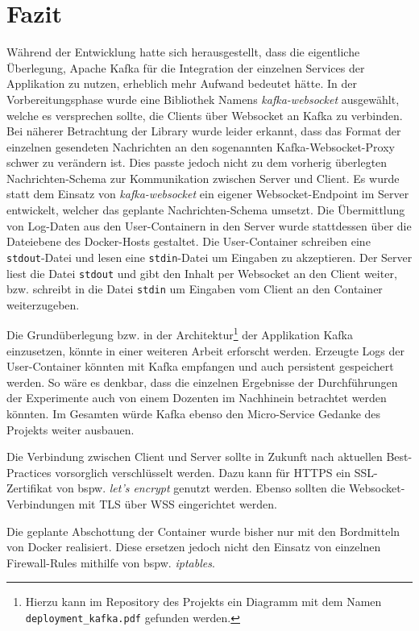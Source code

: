 \chapter{Fazit}
Während der Entwicklung hatte sich herausgestellt, dass die eigentliche Überlegung, Apache Kafka für die Integration der einzelnen Services der Applikation zu nutzen, erheblich mehr Aufwand bedeutet hätte.
In der Vorbereitungsphase wurde eine Bibliothek Namens \textit{kafka-websocket} ausgewählt, welche es versprechen sollte, die Clients über Websocket an Kafka zu verbinden.
Bei näherer Betrachtung der Library wurde leider erkannt, dass das Format der einzelnen gesendeten Nachrichten an den sogenannten Kafka-Websocket-Proxy schwer zu verändern ist.
Dies passte jedoch nicht zu dem vorherig überlegten Nachrichten-Schema zur Kommunikation zwischen Server und Client.
Es wurde statt dem Einsatz von \textit{kafka-websocket} ein eigener Websocket-Endpoint im Server entwickelt, welcher das geplante Nachrichten-Schema umsetzt.
Die Übermittlung von Log-Daten aus den User-Containern in den Server wurde stattdessen über die Dateiebene des Docker-Hosts gestaltet.
Die User-Container schreiben eine \texttt{stdout}-Datei und lesen eine \texttt{stdin}-Datei um Eingaben zu akzeptieren.
Der Server liest die Datei \texttt{stdout} und gibt den Inhalt per Websocket an den Client weiter, bzw. schreibt in die Datei \texttt{stdin} um Eingaben vom Client an den Container weiterzugeben.
\par
Die Grundüberlegung bzw. in der Architektur\footnote{Hierzu kann im Repository des Projekts ein Diagramm mit dem Namen \texttt{deployment\_kafka.pdf} gefunden werden.} der Applikation Kafka einzusetzen, könnte in einer weiteren Arbeit erforscht werden.
Erzeugte Logs der User-Container könnten mit Kafka empfangen und auch persistent gespeichert werden.
So wäre es denkbar, dass die einzelnen Ergebnisse der Durchführungen der Experimente auch von einem Dozenten im Nachhinein betrachtet werden könnten.
Im Gesamten würde Kafka ebenso den Micro-Service Gedanke des Projekts weiter ausbauen.
\par
Die Verbindung zwischen Client und Server sollte in Zukunft nach aktuellen Best-Practices vorsorglich verschlüsselt werden.
Dazu kann für HTTPS ein SSL-Zertifikat von \ac{bspw.} \textit{let's encrypt} genutzt werden.
Ebenso sollten die Websocket-Verbindungen mit TLS über WSS eingerichtet werden.
\par
Die geplante Abschottung der Container wurde bisher nur mit den Bordmitteln von Docker realisiert.
Diese ersetzen jedoch nicht den Einsatz von einzelnen Firewall-Rules mithilfe von \ac{bspw.} \textit{iptables}.

